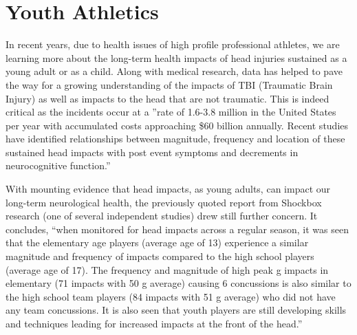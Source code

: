 \documentclass[sigconf]{acmart}
\begin{document}
\section{Youth Athletics}

In recent years, due to health issues of high profile professional athletes, we are learning more about the long-term health impacts of head injuries sustained as a young adult or as a child.  Along with medical research, data has helped to pave the way for a growing understanding of the impacts of TBI (Traumatic Brain Injury) as well as impacts to the head that are not traumatic.  This is indeed critical as the incidents occur at a ''rate of 1.6-3.8 million in the United States per year with accumulated costs approaching \$60 billion annually.  Recent studies have identified relationships between magnitude, frequency and location of these sustained head impacts with post event symptoms and decrements in neurocognitive function.''\cite{www-theshockbox-com}

With mounting evidence that head impacts, as young adults, can impact our long-term neurological health, the previously quoted report from Shockbox research (one of several independent studies) drew still further concern.  It concludes, ``when monitored for head impacts across a regular season, it was seen that the elementary age players (average age of 13) experience a similar magnitude and frequency of impacts compared to the high school players (average age of 17).  The frequency and magnitude of high peak g impacts in elementary (71 impacts with 50 g average) causing 6 concussions is also similar to the high school team players (84 impacts with 51 g average) who did not have any team concussions.  It is also seen that youth players are still developing skills and techniques leading for increased impacts at the front of the head.'' \cite{www-theshockbox-com} 
\end{document}
